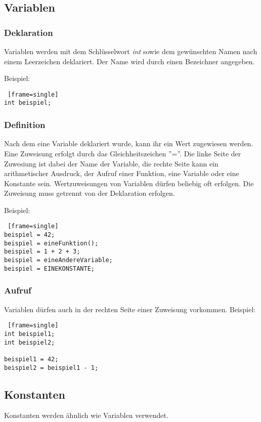 \pagebreak
\subsection{Variablen}
\subsubsection{Deklaration}
Variablen werden mit dem Schlüsselwort \textit{int} sowie dem gewünschten Namen nach einem Leerzeichen deklariert.
Der Name wird durch einen Bezeichner angegeben.

Beispiel:
\begin{lstlisting} [frame=single] 
int beispiel;
\end{lstlisting}

\subsubsection{Definition}
Nach dem eine Variable deklariert wurde, kann ihr ein Wert zugewiesen werden. Eine Zuweisung erfolgt durch das Gleichheitszeichen ''=''. Die linke Seite der Zuwesiung ist dabei der Name der Variable, die rechte Seite  kann ein arithmetischer Ausdruck, der Aufruf einer Funktion, eine Variable oder eine Konstante sein.
Wertzuweisungen von Variablen dürfen beliebig oft erfolgen.
Die Zuweisung muss getrennt von der Deklaration erfolgen.

Beispiel:
\begin{lstlisting} [frame=single] 
beispiel = 42;
beispiel = eineFunktion();
beispiel = 1 + 2 + 3;
beispiel = eineAndereVariable;
beispiel = EINEKONSTANTE;
\end{lstlisting}


\subsubsection{Aufruf}
Variablen dürfen auch in der rechten Seite einer Zuweisung vorkommen.
Beispiel:
\begin{lstlisting} [frame=single] 
int beispiel1;
int beispiel2;

beispiel1 = 42;
beispiel2 = beispiel1 - 1;
\end{lstlisting}

\pagebreak
\subsection{Konstanten}
Konstanten werden ähnlich wie Variablen verwendet.

